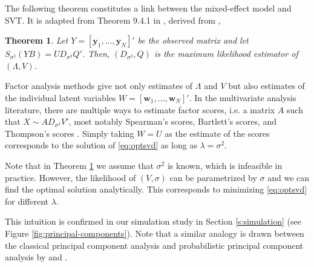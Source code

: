 \documentclass[preprint]{imsart}
\numberwithin{equation}{section}
\theoremstyle{plain}
\newtheorem{theorem}{Theorem}
\newcommand{\tr}[1]{{\textcolor{red}{#1}}}
\newcommand{\by}{\mathbf{y}}
\newcommand{\bw}{\mathbf{w}}
\begin{document}
The following theorem constitutes a link between the mixed-effect model and SVT. It is adapted from Theorem 9.4.1 in \citet{mardia1980multivariate}, derived from \citet{joreskog1967some}, 

\begin{theorem}\label{thm:maxlike}
  Let $Y = [\by_1,...,\by_N]'$ be the observed matrix and let $S_{\sigma^2}(YB) = UD_{\sigma^2}Q'$. Then, $(D_{\sigma^2},Q)$ is the maximum likelihood estimator of $(\Lambda,V)$.
\end{theorem}

Factor analysis methods give not only estimates of $\Lambda$ and $V$ but also estimates of the individual latent variables $W = [\bw_1,...,\bw_N]'$.
In the multivariate analysis literature, there are multiple ways to estimate factor scores, i.e. a matrix $A$ such that $X \sim AD_{\sigma^2}V'$, most notably Spearman's scores, Bartlett's scores, and Thompson's scores \citep{kim1978factor}. %
Simply taking $W = U$ as the estimate of the scores corresponds to the solution of \eqref{eq:optsvd} as long as $\lambda = \sigma^2$.

Note that in Theorem \ref{thm:maxlike} we assume that $\sigma^2$ is known, which is infeasible in practice. However, the likelihood of $(V,\sigma)$ can be parametrized by $\sigma$ and we can find the optimal solution analytically. This corresponds to minimizing \eqref{eq:optsvd} for different $\lambda$.


This intuition is confirmed in our simulation study in Section \ref{s:simulation} (see Figure \ref{fig:principal-components}). Note that a similar analogy is drawn between the classical principal component analysis and probabilistic principal component analysis by \citet{tipping1999probabilistic} and \citet{james2000principal}. 

\end{document}
